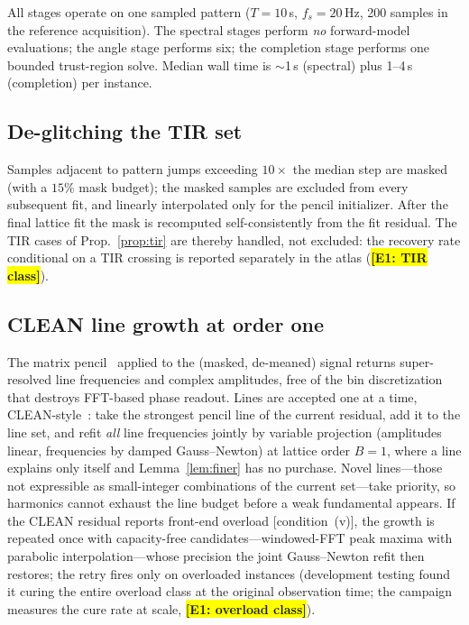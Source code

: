 \documentclass[twocolumn,preprintnumbers,amsmath,amssymb,pra,floatfix]{revtex4-2}
\newcommand{\PH}[1]{\colorbox{yellow}{\textbf{\small [#1]}}}
\begin{document}
All stages operate on one sampled pattern ($T=10$\,s, $f_s=20$\,Hz,
200 samples in the reference acquisition).  The spectral stages perform \emph{no}
forward-model evaluations; the angle stage performs six; the completion
stage performs one bounded trust-region solve.  Median wall time is
$\sim$1\,s (spectral) plus 1--4\,s (completion) per instance.

\subsection{De-glitching the TIR set}
\label{sec:deglitch}

Samples adjacent to pattern jumps exceeding $10\times$ the median
step are masked (with a $15\%$ mask budget); the masked samples are
excluded from every subsequent fit, and linearly interpolated only for
the pencil initializer.  After the final lattice fit the mask is
recomputed self-consistently from the fit residual.  The TIR cases of
Prop.~\ref{prop:tir} are thereby handled, not excluded: the recovery
rate conditional on a TIR crossing is reported separately in the
atlas (\PH{E1: TIR class}).

\subsection{CLEAN line growth at order one}
\label{sec:clean}

The matrix pencil~\cite{HuaSarkar1990,RoyKailath1989} applied to the
(masked, de-meaned) signal returns super-resolved line frequencies and
complex amplitudes, free of the bin discretization that destroys
FFT-based phase readout.  Lines are accepted one at a time,
CLEAN-style~\cite{Hogbom1974}: take the strongest pencil line of the
current residual, add it to the line set, and refit \emph{all} line
frequencies jointly by variable projection
\cite{GolubPereyra1973} (amplitudes linear, frequencies by damped
Gauss--Newton) at lattice order $B{=}1$, where a line explains only
itself and Lemma~\ref{lem:finer} has no purchase.  Novel lines---those
not expressible as small-integer combinations of the current
set---take priority, so harmonics cannot exhaust the line budget
before a weak fundamental appears.  If the CLEAN residual reports
front-end overload [condition~(v)], the growth is repeated once with
capacity-free candidates---windowed-FFT peak maxima with parabolic
interpolation---whose precision the joint Gauss--Newton refit then
restores; the retry fires only on overloaded instances (development
testing found it curing the entire overload class at the original
observation time; the campaign measures the cure rate at scale,
\PH{E1: overload class}).
\end{document}
